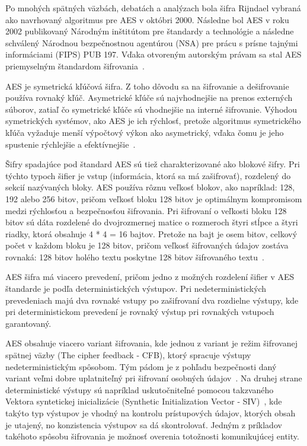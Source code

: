 Po mnohých spätných väzbách, debatách a analýzach bola šifra Rijndael vybraná ako navrhovaný algoritmus pre AES v
októbri 2000.
Následne bol AES v roku 2002 publikovaný Národným inštitútom pre štandardy a technológie a následne schválený Národnou bezpečnostnou
agentúrou (NSA) pre prácu s prísne tajnými informáciami (FIPS) PUB 197.
Vďaka otvoreným autorským právam sa stal AES priemyselným štandardom šifrovania~\cite{UnderstandingAes}.

AES je symetrická kľúčová šifra.
Z toho dôvodu sa na šifrovanie a dešifrovanie používa rovnaký kľúč.
Asymetrické kľúče sú najvhodnejšie na prenos externých súborov, zatiaľ čo symetrické kľúče sú vhodnejšie na interné
šifrovanie.
Výhodou symetrických systémov, ako AES je ich rýchlosť, pretože algoritmus symetrického kľúča vyžaduje menší výpočtový
výkon ako asymetrický, vďaka čomu je jeho spustenie rýchlejšie a efektívnejšie~\cite{UnderstandingAes}.

Šifry spadajúce pod štandard AES sú tiež charakterizované ako blokové šifry.
Pri týchto typoch šifier je vstup (informácia, ktorá sa má zašifrovať), rozdelený do sekcií nazývaných bloky.
AES používa rôznu veľkosť blokov, ako napríklad: 128, 192 alebo 256 bitov, pričom veľkosť bloku 128 bitov je optimálnym
kompromisom medzi rýchlosťou a bezpečnosťou šifrovania.
Pri šifrovaní o veľkosti bloku 128 bitov sú dáta rozdelené do dvojrozmernej matice o rozmeroch štyri stĺpce a štyri riadky,
ktorá obsahuje 4 * 4 = 16 bajtov.
Pretože na bajt je osem bitov, celkový počet v každom bloku je 128 bitov, pričom veľkosť šifrovaných údajov zostáva
rovnaká: 128 bitov holého textu poskytne 128 bitov šifrovaného textu~\cite{rfc3602}.

AES šifra má viacero prevedení, pričom jedno z možných rozdelení šifier v AES štandarde je podľa deterministických výstupov.
Pri nedeterministických prevedeniach majú dva rovnaké vstupy po zašifrovaní dva rozdielne výstupy, kde pri deterministickom
prevedení je rovnaký výstup pri rovnakých vstupoch garantovaný.

AES obsahuje viacero variant šifrovania, kde jednou z variant je režim šifrovanej spätnej väzby (The cipher feedback - CFB),
ktorý spracuje výstupy nedeterministickým spôsobom.
Tým pádom je z pohľadu bezpečnosti daný variant veľmi dobre uplatniteľný pri šifrovaní osobných údajov~\cite{CFB}.
Na druhej strane deterministické výstupy sú napríklad uskutočniteľné pomocou takzvaného Vektora syntetickej inicializácie
(Synthetic Initialization Vector - SIV)~\cite{SIV}, kde takýto typ výstupov je vhodný na kontrolu prístupových údajov, ktorých obsah je
utajený, no konzistencia výstupov sa dá skontrolovať.
Jedným z príkladov takéhoto spôsobu šifrovania je možnosť overenia totožnosti komunikujúcej entity.

